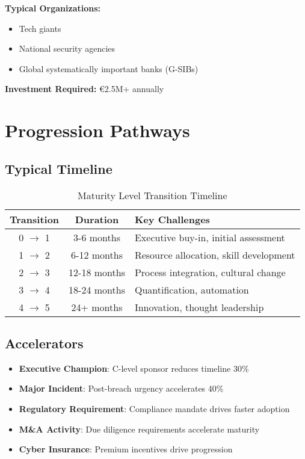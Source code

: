\documentclass[11pt,a4paper]{article}
\begin{document}
\textbf{Typical Organizations:}
\begin{itemize}
\item Tech giants
\item National security agencies
\item Global systematically important banks (G-SIBs)
\end{itemize}

\textbf{Investment Required:} €2.5M+ annually

\section{Progression Pathways}

\subsection{Typical Timeline}

\begin{table}[h]
\centering
\caption{Maturity Level Transition Timeline}
\begin{tabular}{ccp{5cm}}
\toprule
\textbf{Transition} & \textbf{Duration} & \textbf{Key Challenges} \\
\midrule
0 $\rightarrow$ 1 & 3-6 months & Executive buy-in, initial assessment \\
1 $\rightarrow$ 2 & 6-12 months & Resource allocation, skill development \\
2 $\rightarrow$ 3 & 12-18 months & Process integration, cultural change \\
3 $\rightarrow$ 4 & 18-24 months & Quantification, automation \\
4 $\rightarrow$ 5 & 24+ months & Innovation, thought leadership \\
\bottomrule
\end{tabular}
\end{table}

\subsection{Accelerators}
\begin{itemize}
\item \textbf{Executive Champion}: C-level sponsor reduces timeline 30\%
\item \textbf{Major Incident}: Post-breach urgency accelerates 40\%
\item \textbf{Regulatory Requirement}: Compliance mandate drives faster adoption
\item \textbf{M\&A Activity}: Due diligence requirements accelerate maturity
\item \textbf{Cyber Insurance}: Premium incentives drive progression
\end{itemize}
\end{document}
